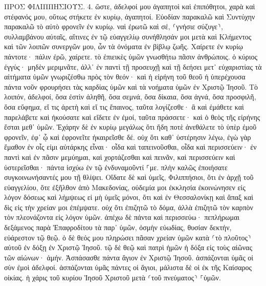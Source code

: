 \documentclass[twoside, 9pt]{extreport}
\begin{document}
ΠΡΟΣ ΦΙΛΙΠΠΗΣΙΟΥΣ.
4.
ὥστε, ἀδελφοί μου ἀγαπητοὶ καὶ ἐπιπόθητοι, χαρὰ καὶ στέφανός μου, οὕτως στήκετε ἐν κυρίῳ, ἀγαπητοί. 
Εὐοδίαν παρακαλῶ καὶ Συντύχην παρακαλῶ τὸ αὐτὸ φρονεῖν ἐν κυρίῳ. 
ναὶ ἐρωτῶ καὶ σέ, ⸂γνήσιε σύζυγε⸃, συλλαμβάνου αὐταῖς, αἵτινες ἐν τῷ εὐαγγελίῳ συνήθλησάν μοι μετὰ καὶ Κλήμεντος καὶ τῶν λοιπῶν συνεργῶν μου, ὧν τὰ ὀνόματα ἐν βίβλῳ ζωῆς. 
Χαίρετε ἐν κυρίῳ πάντοτε· πάλιν ἐρῶ, χαίρετε. 
τὸ ἐπιεικὲς ὑμῶν γνωσθήτω πᾶσιν ἀνθρώποις. ὁ κύριος ἐγγύς· 
μηδὲν μεριμνᾶτε, ἀλλ᾽ ἐν παντὶ τῇ προσευχῇ καὶ τῇ δεήσει μετ᾽ εὐχαριστίας τὰ αἰτήματα ὑμῶν γνωριζέσθω πρὸς τὸν θεόν· 
καὶ ἡ εἰρήνη τοῦ θεοῦ ἡ ὑπερέχουσα πάντα νοῦν φρουρήσει τὰς καρδίας ὑμῶν καὶ τὰ νοήματα ὑμῶν ἐν Χριστῷ Ἰησοῦ. 
Τὸ λοιπόν, ἀδελφοί, ὅσα ἐστὶν ἀληθῆ, ὅσα σεμνά, ὅσα δίκαια, ὅσα ἁγνά, ὅσα προσφιλῆ, ὅσα εὔφημα, εἴ τις ἀρετὴ καὶ εἴ τις ἔπαινος, ταῦτα λογίζεσθε· 
ἃ καὶ ἐμάθετε καὶ παρελάβετε καὶ ἠκούσατε καὶ εἴδετε ἐν ἐμοί, ταῦτα πράσσετε· καὶ ὁ θεὸς τῆς εἰρήνης ἔσται μεθ᾽ ὑμῶν. 
Ἐχάρην δὲ ἐν κυρίῳ μεγάλως ὅτι ἤδη ποτὲ ἀνεθάλετε τὸ ὑπὲρ ἐμοῦ φρονεῖν, ἐφ᾽ ᾧ καὶ ἐφρονεῖτε ἠκαιρεῖσθε δέ. 
οὐχ ὅτι καθ᾽ ὑστέρησιν λέγω, ἐγὼ γὰρ ἔμαθον ἐν οἷς εἰμι αὐτάρκης εἶναι· 
οἶδα καὶ ταπεινοῦσθαι, οἶδα καὶ περισσεύειν· ἐν παντὶ καὶ ἐν πᾶσιν μεμύημαι, καὶ χορτάζεσθαι καὶ πεινᾶν, καὶ περισσεύειν καὶ ὑστερεῖσθαι· 
πάντα ἰσχύω ἐν τῷ ἐνδυναμοῦντί ⸀με. 
πλὴν καλῶς ἐποιήσατε συγκοινωνήσαντές μου τῇ θλίψει. 
Οἴδατε δὲ καὶ ὑμεῖς, Φιλιππήσιοι, ὅτι ἐν ἀρχῇ τοῦ εὐαγγελίου, ὅτε ἐξῆλθον ἀπὸ Μακεδονίας, οὐδεμία μοι ἐκκλησία ἐκοινώνησεν εἰς λόγον δόσεως καὶ λήμψεως εἰ μὴ ὑμεῖς μόνοι, 
ὅτι καὶ ἐν Θεσσαλονίκῃ καὶ ἅπαξ καὶ δὶς εἰς τὴν χρείαν μοι ἐπέμψατε. 
οὐχ ὅτι ἐπιζητῶ τὸ δόμα, ἀλλὰ ἐπιζητῶ τὸν καρπὸν τὸν πλεονάζοντα εἰς λόγον ὑμῶν. 
ἀπέχω δὲ πάντα καὶ περισσεύω· πεπλήρωμαι δεξάμενος παρὰ Ἐπαφροδίτου τὰ παρ᾽ ὑμῶν, ὀσμὴν εὐωδίας, θυσίαν δεκτήν, εὐάρεστον τῷ θεῷ. 
ὁ δὲ θεός μου πληρώσει πᾶσαν χρείαν ὑμῶν κατὰ ⸂τὸ πλοῦτος⸃ αὐτοῦ ἐν δόξῃ ἐν Χριστῷ Ἰησοῦ. 
τῷ δὲ θεῷ καὶ πατρὶ ἡμῶν ἡ δόξα εἰς τοὺς αἰῶνας τῶν αἰώνων· ἀμήν. 
Ἀσπάσασθε πάντα ἅγιον ἐν Χριστῷ Ἰησοῦ. ἀσπάζονται ὑμᾶς οἱ σὺν ἐμοὶ ἀδελφοί. 
ἀσπάζονται ὑμᾶς πάντες οἱ ἅγιοι, μάλιστα δὲ οἱ ἐκ τῆς Καίσαρος οἰκίας. 
ἡ χάρις τοῦ κυρίου Ἰησοῦ Χριστοῦ μετὰ ⸂τοῦ πνεύματος⸃ ⸀ὑμῶν. 
\end{document}
